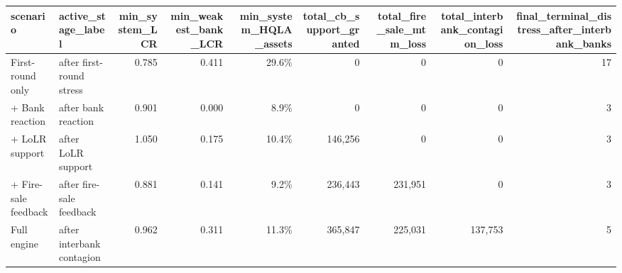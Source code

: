 \begin{tabular}{llrrrrrrr}
\toprule
scenario & active_stage_label & min_system_LCR & min_weakest_bank_LCR & min_system_HQLA_assets & total_cb_support_granted & total_fire_sale_mtm_loss & total_interbank_contagion_loss & final_terminal_distress_after_interbank_banks \\
\midrule
First-round only & after first-round stress & 0.785 & 0.411 & 29.6\% & 0 & 0 & 0 & 17 \\
+ Bank reaction & after bank reaction & 0.901 & 0.000 & 8.9\% & 0 & 0 & 0 & 3 \\
+ LoLR support & after LoLR support & 1.050 & 0.175 & 10.4\% & 146,256 & 0 & 0 & 3 \\
+ Fire-sale feedback & after fire-sale feedback & 0.881 & 0.141 & 9.2\% & 236,443 & 231,951 & 0 & 3 \\
Full engine & after interbank contagion & 0.962 & 0.311 & 11.3\% & 365,847 & 225,031 & 137,753 & 5 \\
\bottomrule
\end{tabular}
